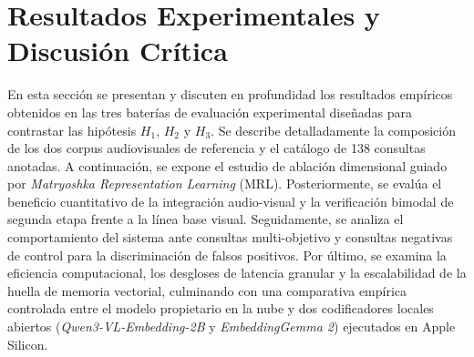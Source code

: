 \section{Resultados Experimentales y Discusión Crítica}
\label{sec:resultados_experimentales_discusion}

En esta sección se presentan y discuten en profundidad los resultados empíricos obtenidos en las tres baterías de evaluación experimental diseñadas para contrastar las hipótesis $H_1$, $H_2$ y $H_3$. Se describe detalladamente la composición de los dos corpus audiovisuales de referencia y el catálogo de 138 consultas anotadas. A continuación, se expone el estudio de ablación dimensional guiado por \textit{Matryoshka Representation Learning} (MRL). Posteriormente, se evalúa el beneficio cuantitativo de la integración audio-visual y la verificación bimodal de segunda etapa frente a la línea base visual. Seguidamente, se analiza el comportamiento del sistema ante consultas multi-objetivo y consultas negativas de control para la discriminación de falsos positivos. Por último, se examina la eficiencia computacional, los desgloses de latencia granular y la escalabilidad de la huella de memoria vectorial, culminando con una comparativa empírica controlada entre el modelo propietario en la nube y dos codificadores locales abiertos (\textit{Qwen3-VL-Embedding-2B} y \textit{EmbeddingGemma 2}) ejecutados en Apple Silicon.


\newpage


\newpage


\newpage


\newpage


\newpage


